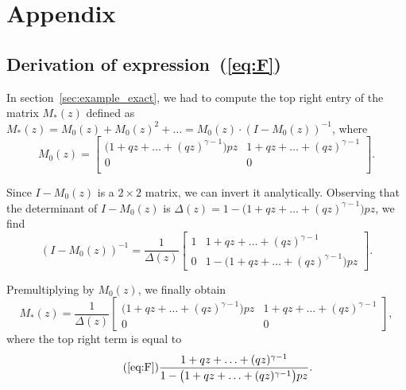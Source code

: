 \documentclass{article}
\begin{document}





\appendix
\section{Appendix}
\subsection{Derivation of expression~(\ref{eq:F})}
\label{app_ex1}

In section~\ref{sec:example_exact}, we had to compute the top right entry
of the matrix $M_*(z)$ defined as $M_*(z) = M_0(z) + M_0(z)^2 + \ldots =
M_0(z) \cdot (I-M_0(z))^{-1}$, where
\begin{equation*}
M_0(z) =
\begin{bmatrix}
\big( 1+qz+\ldots+(qz)^{\gamma-1}
\big) pz  & 1+qz+\ldots+(qz)^{\gamma-1} \\
0 & 0 \\
\end{bmatrix}.
\end{equation*}

Since $I-M_0(z)$ is a $2\times2$ matrix, we can invert it analytically.
Observing that the determinant of $I-M_0(z)$ is $\Delta(z) = 1-\big(
1+qz+\ldots+(qz)^{\gamma-1}\big) pz$, we find
\begin{equation*}
(I-M_0(z))^{-1} = \frac{1}{\Delta(z)}
\begin{bmatrix}
1 & 1+qz+\ldots+(qz)^{\gamma-1} \\
0 & 1-\big( 1+qz+\ldots+(qz)^{\gamma-1} \big) pz
\end{bmatrix}.
\end{equation*}

Premultiplying by $M_0(z)$, we finally obtain
\begin{equation*}
M_*(z) = \frac{1}{\Delta(z)}
\begin{bmatrix}
\big( 1+qz+\ldots+(qz)^{\gamma-1} \big) pz &
1+qz+\ldots+(qz)^{\gamma-1} \\
0 & 0 \end{bmatrix},
\end{equation*}
where the top right term is equal to
\begin{equation}
\tag{\ref{eq:F}}
\frac{1+qz+\ldots+(qz)^{\gamma-1}}
{1-\big( 1+qz+\ldots+(qz)^{\gamma-1} \big) pz}.
\end{equation}
\end{document}
